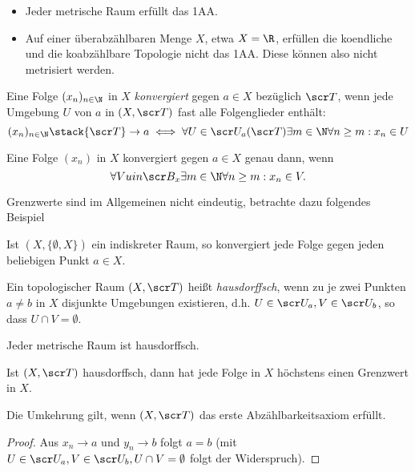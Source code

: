 \begin{ex}
	\begin{itemize}
		\item
			Jeder metrische Raum erfüllt das 1AA.
		\item
			Auf einer überabzählbaren Menge $X$, etwa $X = \R$, erfüllen die koendliche und die koabzählbare Topologie nicht das 1AA.
			Diese können also nicht metrisiert werden.
	\end{itemize}
\end{ex}

\begin{df}
	Eine Folge $(x_n)_{n\in \N}$ in $X$ \emph{konvergiert} gegen $a \in X$ bezüglich $\scr T$, wenn jede Umgebung $U$ von $a$ in $(X, \scr T)$ fast alle Folgenglieder enthält:
	\[
		(x_n)_{n\in \N} \stack{\scr T}\to a
		\iff
		\forall U \in \scr U_a(\scr T) \exists m \in \N \forall n \ge m : x_n \in U
	\]
\end{df}

\begin{prop}
	Eine Folge $(x_n)$ in $X$ konvergiert gegen $a \in X$ genau dann, wenn
	\[
		\forall V uin \scr B_x \exists m \in \N \forall n \ge m : x_n \in V.
	\]
\end{prop}

Grenzwerte sind im Allgemeinen nicht eindeutig, betrachte dazu folgendes Beispiel

\begin{ex}
	Ist $(X, \{\emptyset, X\})$ ein indiskreter Raum, so konvergiert jede Folge gegen jeden beliebigen Punkt $a \in X$.
\end{ex}

\begin{df}
	Ein topologischer Raum $(X, \scr T)$ heißt \emph{hausdorffsch}, wenn zu je zwei Punkten $a \neq b$ in $X$ disjunkte Umgebungen existieren, d.h. $U \in \scr U_a, V \in \scr U_b$, so dass $U \cap V = \emptyset$.
\end{df}

\begin{ex}
	Jeder metrische Raum ist hausdorffsch.
\end{ex}

\begin{st}
	Ist $(X,\scr T)$ hausdorffsch, dann hat jede Folge in $X$ höchstens einen Grenzwert in $X$.

	Die Umkehrung gilt, wenn $(X, \scr T)$ das erste Abzählbarkeitsaxiom erfüllt.
	\begin{proof}
		Aus $x_n \to a$ und $y_n \to b$ folgt $a = b$ (mit $U \in \scr U_a, V \in \scr U_b, U \cap V = \emptyset$ folgt der Widerspruch).
	\end{proof}
\end{st}

